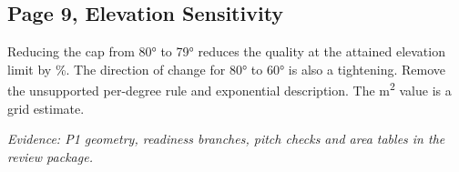 \documentclass[12pt,a4paper]{article}
\begin{document}
\subsection*{Page 9, Elevation Sensitivity}
Reducing the cap from 80° to 79° reduces the quality at the attained elevation limit by \BPitchLoss\%. The direction of change for 80° to 60° is also a tightening. Remove the unsupported per-degree rule and exponential description. The \BGridArea{} m\textsuperscript{2} value is a grid estimate.

\textit{Evidence: P1 geometry, readiness branches, pitch checks and area tables in the review package.}
\end{document}
